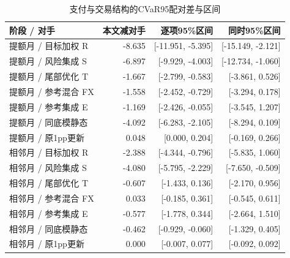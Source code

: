\begin{table}[H]\centering\caption{支付与交易结构的CVaR95配对差与区间}
\fontsize{9bp}{12bp}\selectfont
\begin{tabularx}{\linewidth}{@{}Yrrr@{}}\toprule
阶段 / 对手 & 本文减对手 & 逐项95\%区间 & 同时95\%区间\\\midrule
提额月 / 目标加权 R & -8.635 & [-11.951, -5.395] & [-15.149, -2.121]\\
提额月 / 风险集成 S & -6.897 & [-9.929, -4.003] & [-12.734, -1.060]\\
提额月 / 尾部优化 T & -1.667 & [-2.799, -0.583] & [-3.861, 0.526]\\
提额月 / 参考混合 FX & -1.558 & [-2.452, -0.729] & [-3.294, 0.178]\\
提额月 / 参考集成 E & -1.169 & [-2.426, -0.055] & [-3.545, 1.207]\\
提额月 / 同底模静态 & -4.092 & [-6.283, -2.105] & [-8.294, 0.109]\\
提额月 / 原1pp更新 & 0.048 & [0.000, 0.204] & [-0.169, 0.266]\\
相邻月 / 目标加权 R & -2.388 & [-4.344, -0.796] & [-5.835, 1.060]\\
相邻月 / 风险集成 S & -4.080 & [-5.795, -2.229] & [-7.650, -0.509]\\
相邻月 / 尾部优化 T & -0.607 & [-1.433, 0.136] & [-2.170, 0.956]\\
相邻月 / 参考混合 FX & 0.033 & [-0.185, 0.361] & [-0.545, 0.611]\\
相邻月 / 参考集成 E & -0.577 & [-1.778, 0.344] & [-2.664, 1.510]\\
相邻月 / 同底模静态 & -0.462 & [-0.929, -0.060] & [-1.329, 0.405]\\
相邻月 / 原1pp更新 & 0.000 & [-0.007, 0.077] & [-0.092, 0.092]\\
\bottomrule\end{tabularx}
\end{table}